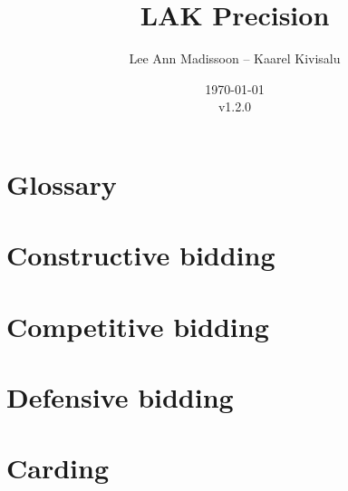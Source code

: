 \documentclass[11pt]{report}
\title{LAK Precision}
\author{Lee Ann Madissoon -- Kaarel Kivisalu}
\date{\today\\v1.2.0}
\begin{document}
\maketitle
\tableofcontents


\chapter*{Glossary}


\chapter{Constructive bidding}



% 
% 











\chapter{Competitive bidding}


\chapter{Defensive bidding}


\chapter{Carding}

\end{document}
